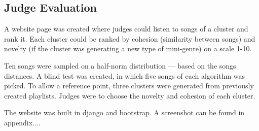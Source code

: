 \documentclass[../report.tex]{subfiles}
\begin{document}
\subsection{Judge Evaluation}
\color{red}{
Purity using the genre as benchmark, assumes that a good cluster is genre coherent. While it could be true, a good cluster could be cross-genre such as Christmas music. To adhere}

A website page was created where judges could listen to songs of a cluster and rank it. Each cluster could be ranked by cohesion (similarity between songs) and novelty (if the cluster was generating a new type of mini-genre) on a scale 1-10.

Ten songs were sampled on a half-norm distribution --- based on the songs distances. A blind test was created, in which five songs of each algorithm was picked. To allow a reference point, three clusters were generated from previously created playlists. Judges were to choose the novelty and cohesion of each cluster.

The website was built in django and bootstrap. A screenshot can be found in appendix....




\end{document}
